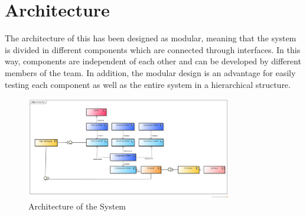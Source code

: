 \section{Architecture}
The architecture of this \epns has been designed as modular, meaning that the system is divided in different components which are connected through interfaces. In this way, components are independent of each other and can be developed by different members of the team. In addition, the modular design is an advantage for easily testing each component as well as the entire system in a hierarchical structure.     

\begin{figure}[htp]
\begin{center}
  \includegraphics[width=0.8\textwidth]{image/cd-architecture.png}
  \caption{Architecture of the System}
  \label{fig:architecture}
\end{center}
\end{figure}









